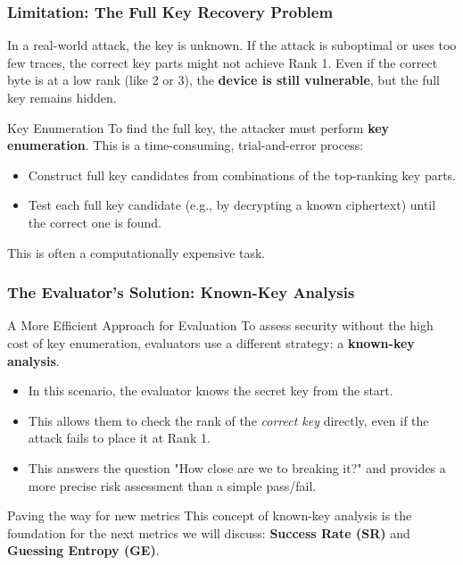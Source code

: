 \begin{frame}
    \frametitle{Limitation: The Full Key Recovery Problem}

        In a real-world attack, the key is unknown. If the attack is suboptimal or uses too few traces, the correct key parts might not achieve Rank 1. Even if the correct byte is at a low rank (like 2 or 3), the \textbf{device is still vulnerable}, but the full key remains hidden.
    
    
    \begin{block}{Key Enumeration}
        To find the full key, the attacker must perform \textbf{key enumeration}. This is a time-consuming, trial-and-error process:
        \begin{itemize}
            \item Construct full key candidates from combinations of the top-ranking key parts.
            \item Test each full key candidate (e.g., by decrypting a known ciphertext) until the correct one is found.
        \end{itemize}
        This is often a computationally expensive task.
    \end{block}
\end{frame}


\begin{frame}
    \frametitle{The Evaluator's Solution: Known-Key Analysis}

    \begin{block}{A More Efficient Approach for Evaluation}
        To assess security without the high cost of key enumeration, evaluators use a different strategy: a \textbf{known-key analysis}.
    \end{block}
    
    \begin{itemize}
        \item In this scenario, the evaluator knows the secret key from the start.
        \item This allows them to check the rank of the \textit{correct key} directly, even if the attack fails to place it at Rank 1.
        \item This answers the question "How close are we to breaking it?" and provides a more precise risk assessment than a simple pass/fail.
    \end{itemize}
    
    \begin{alertblock}{Paving the way for new metrics}
        This concept of known-key analysis is the foundation for the next metrics we will discuss: \textbf{Success Rate (SR)} and \textbf{Guessing Entropy (GE)}.
    \end{alertblock}
\end{frame}


